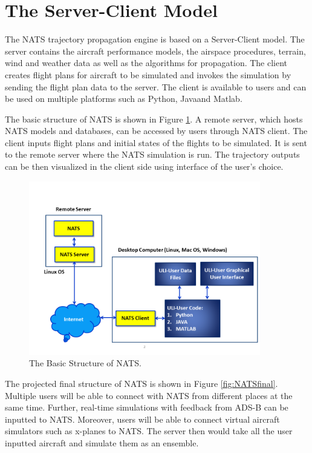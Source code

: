 \documentclass[11pt]{book}              %
\newcommand{\Fig}[1]{Figure \ref{#1}}
\begin{document}
\section{The Server-Client Model}
The NATS trajectory propagation engine is based on a Server-Client model. The server contains the aircraft performance models, the airspace procedures, terrain, wind and weather data as well as the algorithms for propagation. The client creates flight plans for aircraft to be simulated and invokes the simulation by sending the flight plan data to the server.
The client is available to users and can be used on multiple platforms such as Python, Java\texttrademark and Matlab\textregistered.\par
The basic structure of NATS is shown in \Fig{fig:NATSbasic}. A remote server, which hosts NATS models and databases, can be accessed by users through NATS client. The client inputs flight plans and initial states of the flights to be simulated. It is sent to the remote server where the NATS simulation is run. The trajectory outputs can be then visualized in the client side using interface of the user's choice.
\begin{figure}[H]
\includegraphics[width=0.9\textwidth]{Pictures/Slide2.PNG}
\caption{The Basic Structure of NATS. \label{fig:NATSbasic}}
\end{figure}
The projected final structure of NATS is shown in \Fig{fig:NATSfinal}. Multiple users will be able to connect with NATS from different places at the same time. Further, real-time simulations with feedback from ADS-B can be inputted to NATS. Moreover, users will be able to  connect virtual aircraft simulators such as x-planes to NATS. The server then would take all the user inputted aircraft and simulate them as an ensemble.
\end{document}
